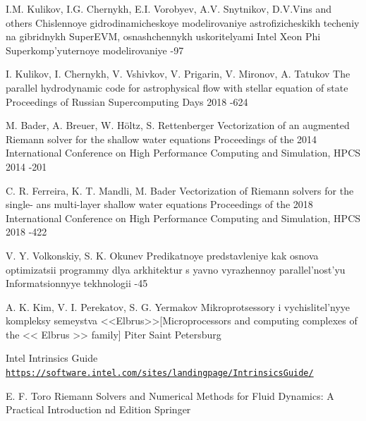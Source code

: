 \documentclass[utf8,english]{psta}%
\begin{document}
\begin{thebibliography}{30}
\by I.M. Kulikov, I.G. Chernykh, E.I. Vorobyev, A.V. Snytnikov, D.V.Vins and others
\paper Chislennoye gidrodinamicheskoye modelirovaniye astrofizicheskikh techeniy na gibridnykh SuperEVM, osnashchennykh uskoritelyami Intel Xeon Phi
\jour Superkomp'yuternoye modelirovaniye 
-97

\by I. Kulikov, I. Chernykh, V. Vshivkov, V. Prigarin, V. Mironov, A. Tatukov
\paper The parallel hydrodynamic code for astrophysical flow with stellar equation of state
\jour Proceedings of Russian Supercomputing Days 2018
-624

\by M. Bader, A. Breuer, W. H{\"o}ltz, S. Rettenberger
\paper Vectorization of an augmented Riemann solver for the shallow water equations
\jour Proceedings of the 2014 International Conference on High Performance Computing and Simulation, HPCS 2014
-201

\by C. R. Ferreira, K. T. Mandli, M. Bader
\paper Vectorization of Riemann solvers for the single- ans multi-layer shallow water equations
\jour Proceedings of the 2018 International Conference on High Performance Computing and Simulation, HPCS 2018
-422

\by V. Y. Volkonskiy, S. K. Okunev
\paper Predikatnoye predstavleniye kak osnova optimizatsii programmy dlya arkhitektur s yavno vyrazhennoy parallel'nost'yu
\jour Informatsionnyye tekhnologii
-45

\by A. K. Kim, V. I. Perekatov, S. G. Yermakov
\book Mikroprotsessory i vychislitel'nyye kompleksy semeystva <<Elbrus>>[Microprocessors and computing complexes of the << Elbrus >> family]
\publ Piter
\publaddr Saint Petersburg

\finalinfo Intel Intrinsics Guide\\
\href{https://software.intel.com/sites/landingpage/IntrinsicsGuide/}{{\tt https://software.intel.com/sites/landingpage/IntrinsicsGuide/}}

\by E. F. Toro
\book Riemann Solvers and Numerical Methods for Fluid Dynamics: A Practical Introduction
 nd Edition
\publ Springer


\end{thebibliography}
\end{document}
